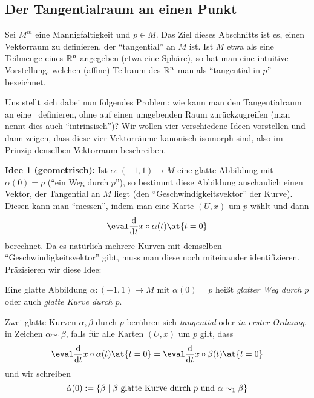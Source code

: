 \subsection{Der Tangentialraum an einen Punkt}
\label{sec:tpm}

Sei $M^m$ eine Mannigfaltigkeit und $p \in M$. Das Ziel dieses
Abschnitts ist es, einen Vektorraum zu definieren, der ``tangential''
an $M$ ist. Ist $M$ etwa als eine Teilmenge eines $\mathbb{R}^n$ angegeben
(etwa eine Sphäre), so hat man eine intuitive Vorstellung, welchen
(affine) Teilraum des $\mathbb{R}^n$ man als ``tangential in $p$'' bezeichnet.

Uns stellt sich dabei nun folgendes Problem: wie kann man den
Tangentialraum an eine \Mfk\ definieren, ohne auf einen umgebenden
Raum zurückzugreifen (man nennt dies auch ``intrinsisch'')? Wir wollen
vier verschiedene Ideen vorstellen und dann zeigen, dass diese vier
Vektorräume kanonisch isomorph sind, also im Prinzip denselben
Vektorraum beschreiben.

\textbf{Idee 1 (geometrisch):} Ist $\alpha \colon (-1,1) \to M$ eine
glatte Abbildung mit $\alpha(0) = p$ (``ein Weg durch $p$''), so
bestimmt diese Abbildung anschaulich einen Vektor, der Tangential an
$M$ liegt (den ``Geschwindigkeitsvektor'' der Kurve). Diesen kann man
``messen'', indem man eine Karte $(U,x)$ um $p$ wählt und dann
\begin{equation*}
  \eval\ddt x\circ \alpha(t)\at{t=0}
\end{equation*}
berechnet. Da es natürlich mehrere Kurven mit demselben
``Geschwindigkeitsvektor'' gibt, muss man diese noch miteinander
identifizieren. Präzisieren wir diese Idee:
\begin{definition}
  Eine glatte Abbildung $\alpha \colon (-1,1) \to M$ mit $\alpha(0) =
  p$ heißt \emph{glatter Weg durch $p$} oder auch \emph{glatte Kurve
    durch $p$}.

  Zwei glatte Kurven $\alpha,\beta$ durch $p$ berühren sich
  \emph{tangential} oder \emph{in erster Ordnung}, in Zeichen $\alpha
  \sim_1 \beta$, falls für alle Karten $(U,x)$ um $p$ gilt, dass
  \begin{equation}\label{eq:firstordercontact}
    \eval\ddt x\circ \alpha(t)\at{t=0} = \eval\ddt x\circ \beta(t)\at{t=0}
  \end{equation}
  und wir schreiben
  \begin{equation*}
    \dot\alpha(0) := \left\lbrace  \beta \mid \beta\text{ glatte Kurve durch
        $p$ und } \alpha \sim_1 \beta  \right\rbrace
  \end{equation*}
\end{definition}

